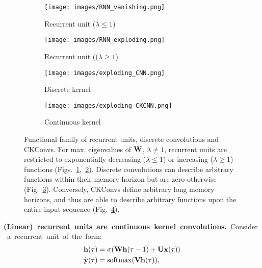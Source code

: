\documentclass{article}
\newcommand{\mat}[1]{\ensuremath{{\mathbf{\MakeUppercase{{#1}}}}}}
\renewcommand{\vec}[1]{\ensuremath{\mathbf{\MakeLowercase{{#1}}}}}
\newcommand{\Wm}{\mat{W}}
\newcommand{\Vm}{\mat{V}}
\newcommand{\Um}{\mat{U}}
\newcommand{\xv}{\vec{x}}
\newcommand{\yv}{\vec{y}}
\newcommand{\hv}{\vec{h}}
\begin{document}
\begin{figure}
     \centering
     \begin{subfigure}[b]{0.24\textwidth}
         \centering
         \texttt{[image: images/RNN\_vanishing.png]}
         \caption{Recurrent unit ($\lambda {\leq} 1$)}
         \label{fig:vanishing_rnn}
     \end{subfigure}
     \hfill
     \begin{subfigure}[b]{0.24\textwidth}
         \centering
         \texttt{[image: images/RNN\_exploding.png]}
         \caption{Recurrent unit (($\lambda {\geq} 1$)}
         \label{fig:exploding_rnn}
     \end{subfigure}
     \hfill
     \begin{subfigure}[b]{0.24\textwidth}
         \centering
         \texttt{[image: images/exploding\_CNN.png]}
         \caption{Discrete kernel}
         \label{fig:exploding_conv}
     \end{subfigure}
     \hfill
     \begin{subfigure}[b]{0.24\textwidth}
         \centering
         \texttt{[image: images/exploding\_CKCNN.png]}
         \caption{Continuous kernel}
         \label{fig:exploding_ckconv}
     \end{subfigure}
     \vspace{-2.8mm}
        \caption{Functional family of recurrent units, discrete convolutions and CKConvs. For max. eigenvalues of $\Wm$, $\lambda{\neq}1$, recurrent units are restricted to exponentially decreasing ($\lambda {\leq} 1$) or increasing ($\lambda {\geq} 1$) functions  (Figs.~\ref{fig:vanishing_rnn},~\ref{fig:exploding_rnn}). Discrete convolutions can describe arbitrary functions within their memory horizon but are zero otherwise (Fig.~\ref{fig:exploding_conv}). Conversely, CKConvs define arbitrary long memory horizons, and thus are able to describe arbitrary functions upon the entire input sequence (Fig.~\ref{fig:exploding_ckconv}).
        \vspace{-3.5mm}}
        \label{fig:vanishing_exploding_analysis}
\end{figure}
\textbf{(Linear)~recurrent~units~are~continuous~kernel~convolutions.}~Consider~a~recurrent~unit~of~the~form:
\begin{align}
 \hv(\tau) &= \sigma (\Wm \hv(\tau - 1) + \Um \xv(\tau))\label{eq:hidden_repr_formulation}\\[0 \jot]
 \tilde{\yv}(\tau) &= \mathrm{softmax}( \Vm \hv (\tau) ),
\end{align}
\end{document}
